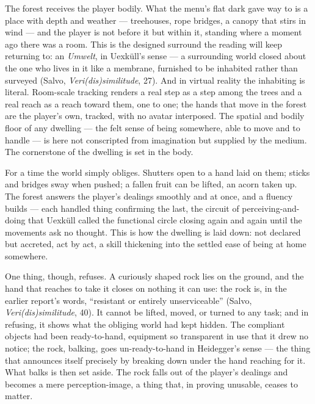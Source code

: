 \documentclass{article}
\begin{document}
The forest receives the player bodily. What the menu's flat dark gave way to is a place with depth and weather — treehouses, rope bridges, a canopy that stirs in wind — and the player is not before it but within it, standing where a moment ago there was a room. This is the designed surround the reading will keep returning to: an \textit{Umwelt}, in Uexküll's sense — a surrounding world closed about the one who lives in it like a membrane, furnished to be inhabited rather than surveyed (Salvo, \textit{Veri(dis)similitude}, 27). And in virtual reality the inhabiting is literal. Room-scale tracking renders a real step as a step among the trees and a real reach as a reach toward them, one to one; the hands that move in the forest are the player's own, tracked, with no avatar interposed. The spatial and bodily floor of any dwelling — the felt sense of being somewhere, able to move and to handle — is here not conscripted from imagination but supplied by the medium. The cornerstone of the dwelling is set in the body.

For a time the world simply obliges. Shutters open to a hand laid on them; sticks and bridges sway when pushed; a fallen fruit can be lifted, an acorn taken up. The forest answers the player's dealings smoothly and at once, and a fluency builds — each handled thing confirming the last, the circuit of perceiving-and-doing that Uexküll called the functional circle closing again and again until the movements ask no thought. This is how the dwelling is laid down: not declared but accreted, act by act, a skill thickening into the settled ease of being at home somewhere.

One thing, though, refuses. A curiously shaped rock lies on the ground, and the hand that reaches to take it closes on nothing it can use: the rock is, in the earlier report's words, ``resistant or entirely unserviceable'' (Salvo, \textit{Veri(dis)similitude}, 40). It cannot be lifted, moved, or turned to any task; and in refusing, it shows what the obliging world had kept hidden. The compliant objects had been ready-to-hand, equipment so transparent in use that it drew no notice; the rock, balking, goes un-ready-to-hand in Heidegger's sense — the thing that announces itself precisely by breaking down under the hand reaching for it. What balks is then set aside. The rock falls out of the player's dealings and becomes a mere perception-image, a thing that, in proving unusable, ceases to matter.
\end{document}
